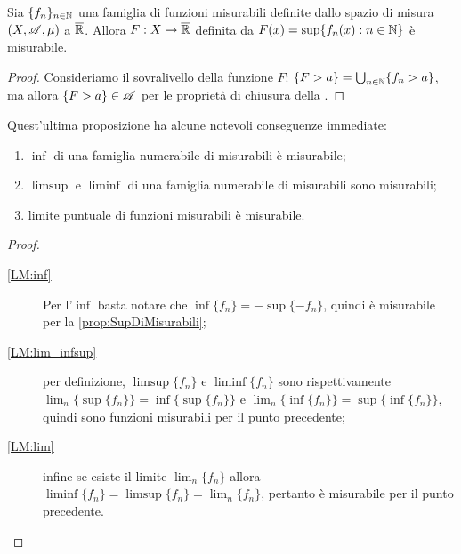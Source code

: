 \begin{proposition}\label{prop:SupDiMisurabili}
	Sia $\{f_n\}_{n\in \mathbb N}$ una famiglia di funzioni misurabili definite dallo spazio di misura $(X,\mathscr A,\mu)$ a $\overline{\mathbb R}$.
	Allora $F:X\rightarrow \overline{\mathbb R}$ definita da $F(x)=\sup\{f_n(x):n\in \mathbb N\}$ è misurabile.
\end{proposition}
\begin{proof}
	Consideriamo il sovralivello della funzione $F$: $\{F>a\}=\bigcup_{n\in \mathbb N}\{f_n>a\}$, ma allora $\{F>a\}\in \mathscr A$ per le proprietà 
	di chiusura della \sigalg.
\end{proof}

\begin{remark}\label{nota:LimMis}
	Quest'ultima proposizione ha alcune notevoli conseguenze immediate:
	\begin{enumerate}
		\item $\inf$ di una famiglia numerabile di misurabili è misurabile;\label{LM:inf}
		\item $\limsup$ e $\liminf$ di una famiglia numerabile di misurabili sono misurabili;\label{LM:lim_infsup}
		\item limite puntuale di funzioni misurabili è misurabile.\label{LM:lim}
	\end{enumerate}
\end{remark}
\begin{proof}
	\begin{description}
		\item[\ref{LM:inf}] Per l'$\inf$ basta notare che $\inf\{f_n\}=-\sup\{-f_n\}$, quindi è misurabile per la \cref{prop:SupDiMisurabili};
		\item[\ref{LM:lim_infsup}] per definizione, $\limsup\{f_n\}$ e $\liminf\{f_n\}$ sono rispettivamente
			$\lim_n\{\sup\{f_n\}\}=\inf\{\sup\{f_n\}\}$ e
			$\lim_n\{\inf\{f_n\}\}=\sup\{\inf\{f_n\}\}$, quindi sono funzioni misurabili per il punto precedente;
		\item[\ref{LM:lim}] infine se esiste il limite $\lim_n\{f_n\}$ allora
			$\liminf\{f_n\}=\limsup\{f_n\}=\lim_n\{f_n\}$, pertanto è misurabile per il punto precedente.
	\end{description}
\end{proof}

